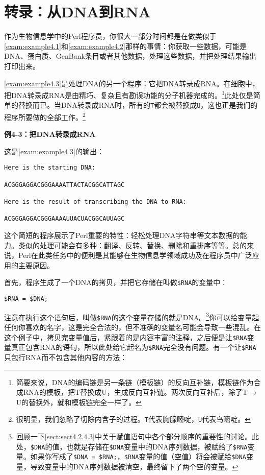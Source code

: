 \section{转录：从DNA到RNA}
作为生物信息学中的Perl程序员，你很大一部分时间都是在做类似于\autoref{exam:example4.1}和\autoref{exam:example4.2}那样的事情：你获取一些数据，可能是DNA、蛋白质、GenBank条目或者其他数据，处理这些数据，并把处理结果输出打印出来。

\autoref{exam:example4.3}是处理DNA的另一个程序：它把DNA转录成RNA。在细胞中，把DNA转录成RNA是由精巧、复杂且有勘误功能的分子机器完成的。\footnote{简要来说，DNA的编码链是另一条链（模板链）的反向互补链，模板链作为合成RNA的模板，把T替换成U，生成反向互补链。两次反向互补后，除了T$\rightarrow$U的替换外，就和模板链完全一样了。}此处仅是简单的替换而已。当DNA转录成RNA时，所有的\verb|T|都会被替换成\verb|U|，这也正是我们的程序所要做的全部工作。\footnote{很明显，我们忽略了切除内含子的过程。\verb|T|代表胸腺嘧啶，\verb|U|代表鸟嘧啶。}

\textbf{例4-3：把DNA转录成RNA}



这是\autoref{exam:example4.3}的输出：

\begin{lstlisting}
Here is the starting DNA:

ACGGGAGGACGGGAAAATTACTACGGCATTAGC

Here is the result of transcribing the DNA to RNA:

ACGGGAGGACGGGAAAAUUACUACGGCAUUAGC
\end{lstlisting}

这个简短的程序展示了Perl重要的特性：轻松处理DNA字符串等文本数据的能力。类似的处理可能会有多种：翻译、反转、替换、删除和重排序等等。总的来说，Perl在此类任务中的便利是其能够在生物信息学领域成功及在程序员中广泛应用的主要原因。

首先，程序生成了一个DNA的拷贝，并把它存储在叫做\verb|$RNA|的变量中：

\begin{lstlisting}
$RNA = $DNA;
\end{lstlisting}

注意在执行这个语句后，叫做\verb|$RNA|的这个变量存储的就是DNA。\footnote{回顾一下\autoref{sect:sect4.2.4.3}中关于赋值语句中各个部分顺序的重要性的讨论。此处，\verb|$DNA|的值，也就是存储在\verb|$DNA|变量中的DNA序列数据，被赋给了\verb|$RNA|变量。如果你写成了\verb|$DNA = $RNA;|，\verb|$RNA|变量的值（空值）将会被赋给\verb|$DNA|变量，导致变量中的DNA序列数据被清空，最终留下了两个空的变量。}你可以给变量起任何你喜欢的名字，这是完全合法的，但不准确的变量名可能会导致一些混乱。在这个例子中，拷贝完变量值后，紧跟着的是内容丰富的注释，之后便是让\verb|$RNA|变量真正包含RNA的语句，所以此处给它起名为\verb|$RNA|完全没有问题。有一个让\verb|$RNA|只包行RNA而不包含其他内容的方法：

